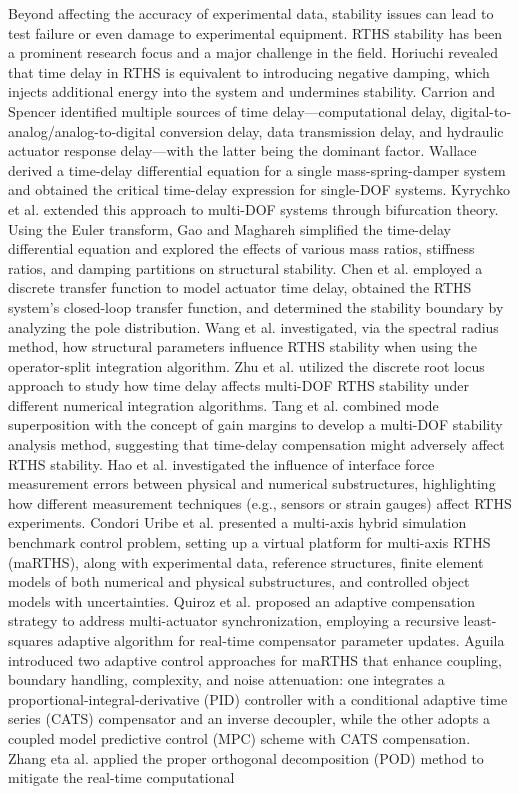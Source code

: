 \documentclass[a4paper, 10pt, conference]{ieeeconf}      %
\begin{document}
Beyond affecting the accuracy of experimental data, stability issues can lead to test failure or even damage to experimental equipment. RTHS stability has been a prominent research focus and a major challenge in the field. Horiuchi \cite{Horiuchi1999} revealed that time delay in RTHS is equivalent to introducing negative damping, which injects additional energy into the system and undermines stability. Carrion and Spencer \cite{Carrion2007} identified multiple sources of time delay—computational delay, digital-to-analog/analog-to-digital conversion delay, data transmission delay, and hydraulic actuator response delay—with the latter being the dominant factor. Wallace \cite{Wallace2005} derived a time-delay differential equation for a single mass-spring-damper system and obtained the critical time-delay expression for single-DOF systems. Kyrychko et al. \cite{Kyrychko2006} extended this approach to multi-DOF systems through bifurcation theory. Using the Euler transform, Gao \cite{Gao2012} and Maghareh \cite{Maghareh2017} simplified the time-delay differential equation and explored the effects of various mass ratios, stiffness ratios, and damping partitions on structural stability. Chen et al. \cite{Chen2008} employed a discrete transfer function to model actuator time delay, obtained the RTHS system’s closed-loop transfer function, and determined the stability boundary by analyzing the pole distribution. Wang et al. \cite{Wang2007} investigated, via the spectral radius method, how structural parameters influence RTHS stability when using the operator-split integration algorithm. Zhu et al. \cite{Zhu2015} utilized the discrete root locus approach to study how time delay affects multi-DOF RTHS stability under different numerical integration algorithms. Tang et al. \cite{Tang2018} combined mode superposition with the concept of gain margins to develop a multi-DOF stability analysis method, suggesting that time-delay compensation might adversely affect RTHS stability. Hao et al. \cite{Ding2025} investigated the influence of interface force measurement errors between physical and numerical substructures, highlighting how different measurement techniques (e.g., sensors or strain gauges) affect RTHS experiments. Condori Uribe et al. \cite{CondoriUribe2023} presented a multi-axis hybrid simulation benchmark control problem, setting up a virtual platform for multi-axis RTHS (maRTHS), along with experimental data, reference structures, finite element models of both numerical and physical substructures, and controlled object models with uncertainties. Quiroz et al. \cite{Quiroz2024} proposed an adaptive compensation strategy to address multi-actuator synchronization, employing a recursive least-squares adaptive algorithm for real-time compensator parameter updates. Aguila \cite{Aguila2024} introduced two adaptive control approaches for maRTHS that enhance coupling, boundary handling, complexity, and noise attenuation: one integrates a proportional-integral-derivative (PID) controller with a conditional adaptive time series (CATS) compensator and an inverse decoupler, while the other adopts a coupled model predictive control (MPC) scheme with CATS compensation. Zhang eta al. \cite{Zhang2024} applied the proper orthogonal decomposition (POD) method to mitigate the real-time computational 
\end{document}
